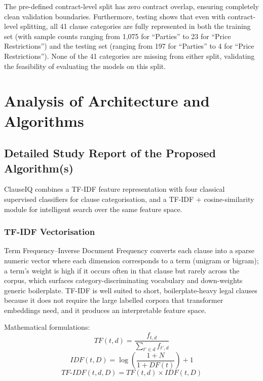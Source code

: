 \documentclass[12pt, a4paper]{report}
\begin{document}
The pre-defined contract-level split has zero contract overlap, ensuring completely clean validation boundaries. Furthermore, testing shows that even with contract-level splitting, all 41 clause categories are fully represented in both the training set (with sample counts ranging from 1,075 for ``Parties'' to 23 for ``Price Restrictions'') and the testing set (ranging from 197 for ``Parties'' to 4 for ``Price Restrictions''). None of the 41 categories are missing from either split, validating the feasibility of evaluating the models on this split.

\newpage

\section{Analysis of Architecture and Algorithms}

\subsection{Detailed Study Report of the Proposed Algorithm(s)}
ClauseIQ combines a TF-IDF feature representation with four classical supervised classifiers for clause categorisation, and a TF-IDF + cosine-similarity module for intelligent search over the same feature space.

\subsubsection{TF-IDF Vectorisation}
Term Frequency–Inverse Document Frequency converts each clause into a sparse numeric vector where each dimension corresponds to a term (unigram or bigram); a term's weight is high if it occurs often in that clause but rarely across the corpus, which surfaces category-discriminating vocabulary and down-weights generic boilerplate. TF-IDF is well suited to short, boilerplate-heavy legal clauses because it does not require the large labelled corpora that transformer embeddings need, and it produces an interpretable feature space.

Mathematical formulations:
\begin{equation}
    TF(t, d) = \frac{f_{t,d}}{\sum_{t' \in d} f_{t', d}}
\end{equation}
\begin{equation}
    IDF(t, D) = \log \left( \frac{1 + N}{1 + DF(t)} \right) + 1
\end{equation}
\begin{equation}
    TF\text{-}IDF(t, d, D) = TF(t, d) \times IDF(t, D)
\end{equation}
\end{document}
